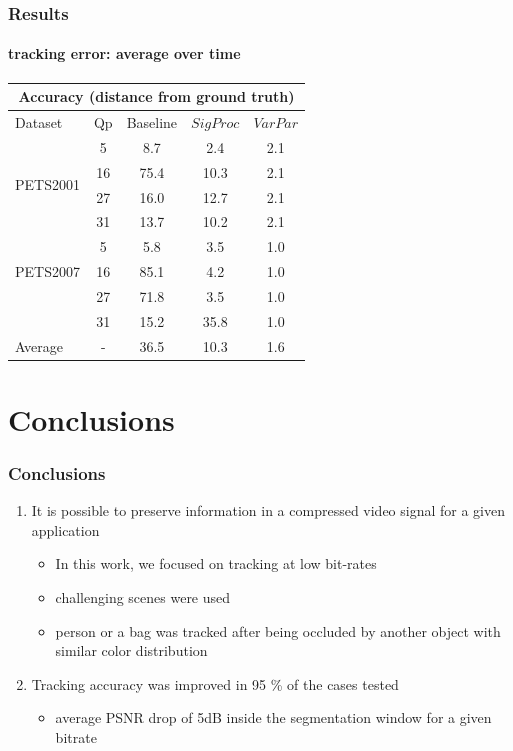 \begin{frame}
\frametitle{Results}
\framesubtitle{tracking error: average over time}
\logoCSIPCPL\mypagenum
	\begin{table}
		\centering
		\begin{tabular}{|l|c|c|c|c|}
			\hline
			\multicolumn{5}{|c|}{Accuracy (distance from ground truth)} \\
			\hline
			Dataset & Qp & Baseline & $SigProc$  & $VarPar$\\ 
			\hline
			\multirow{4}{*}{PETS2001} 
				&5  & 8.7 	&   2.4 &   2.1 \\
				&16 & 75.4 &  10.3 &   2.1\\
				&27 &16.0 	&  12.7 &   2.1\\
				&31 &13.7 &  10.2 &   2.1\\
			\hline
			\multirow{3}{*}{PETS2007} 
				&5 &5.8 &   3.5 &   1.0\\
				&16 &85.1 &   4.2 &   1.0\\
				&27 &71.8 &   3.5 &   1.0\\
				&31 &15.2 &  35.8 &   1.0\\
			\hline
			\multirow{1}{*}{Average}
			& - & 36.5 & 10.3 & 1.6 \\  
			\hline
		\end{tabular}
	\end{table}
\end{frame}



\section{Conclusions}
\begin{frame}\frametitle{Conclusions} \logoCSIPCPL\mypagenum
	\begin{enumerate}
		\item It is possible to preserve information in a compressed video signal for a given application
			\begin{itemize}
				\item In this work, we focused on tracking at low bit-rates
				\item challenging scenes were used
				\item person or a bag was tracked after being occluded by another object with similar color distribution
			\end{itemize}
		\item Tracking accuracy was improved in 95 \% of the cases tested
			\begin{itemize}
				\item average PSNR drop of 5dB inside the segmentation window for a given bitrate
			\end{itemize}
	\end{enumerate}
\end{frame}




